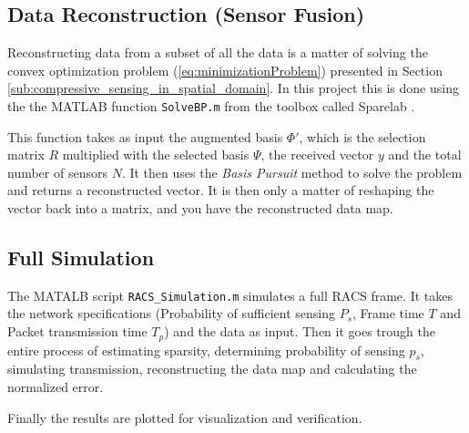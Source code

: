 \documentclass[Main]{subfiles}
\begin{document}
	\subsection{Data Reconstruction (Sensor Fusion)} %
	\label{sub:data_reconstruction}

		Reconstructing data from a subset of all the data is a matter of solving the convex optimization problem (\ref{eq:minimizationProblem}) presented in Section \ref{sub:compressive_sensing_in_spatial_domain}.
		In this project this is done using the the MATLAB function \texttt{SolveBP.m} from the toolbox called Sparelab \cite{SparseLab:Online}.
		
		This function takes as input the augmented basis $\Phi'$, which is the selection matrix $R$ multiplied with the selected basis $\Psi$, the received vector $y$ and the total number of sensors $N$.
		It then uses the \emph{Basis Pursuit} method to solve the problem and returns a reconstructed vector.
		It is then only a matter of reshaping the vector back into a matrix, and you have the reconstructed data map.

	

	\subsection{Full Simulation} %
		\label{sub:full_simulation}

		The MATALB script \texttt{RACS\_Simulation.m} simulates a full RACS frame.
		It takes the network specifications (Probability of sufficient sensing $P_s$, Frame time $T$ and Packet transmission time $T_p$) and the data as input.
		Then it goes trough the entire process of estimating sparsity, determining probability of sensing $p_s$, simulating transmission, reconstructing the data map and calculating the normalized error.

		Finally the results are plotted for visualization and verification.
		

\end{document}
